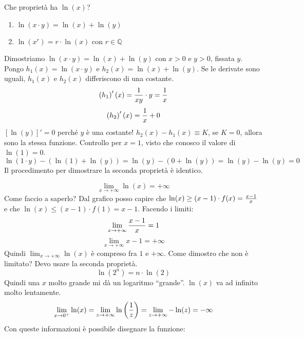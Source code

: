 \documentclass[12pt,a4paper]{article}
\begin{document}
Che propriet\`a ha $\ln(x)$?
\begin{enumerate}
\item   $\ln(x \cdot y) = \ln(x) + \ln(y) $
\item   $\ln(x^r) = r \cdot \ln(x)$ con $r \in \mathbb{Q}$
\end{enumerate}
Dimostriamo $\ln(x \cdot y) = \ln(x) + \ln(y)$ con $x>0$ e $y>0$,
fissata $y$. Pongo $h_1 (x) = \ln(x \cdot y)$ e 
$h_2 (x) = \ln(x) + \ln(y)$. Se le derivate sono uguali, $h_1(x)$
e $h_2(x)$ differiscono di una costante.
$$ \left( h_1 \right)'(x) = {1 \over xy} \cdot y = {1 \over x} $$
$$ \left( h_2 \right)'(x) = {1 \over x} + 0 $$
$\left[ \ln(y) \right]' = 0$ perch\'e $y$ \`e una costante!
$ h_2 (x) - h_1(x) \equiv K$, se $K = 0$, allora sono la stessa funzione.
Controllo per $x=1$, visto che conosco il valore di $\ln(1) = 0$.
$$ \ln(1 \cdot y) - \left( \ln(1) + \ln(y) \right) = 
\ln(y) - \left( 0 + \ln(y) \right) = \ln(y) - \ln(y) = 0 $$
Il procedimento per dimostrare la seconda propriet\`a \`e identico.

$$ \lim_{x \to +\infty} \ln(x) = +\infty $$
Come faccio a saperlo? Dal grafico posso capire che
$ \ln(x) \geq (x-1) \cdot f(x) = {x-1 \over x} $ e che
$ \ln(x) \leq (x-1) \cdot f(1) = x-1 $. Facendo i limiti:
$$ \lim_{x \to +\infty} {x-1 \over x} = 1 $$
$$ \lim_{x \to +\infty} x-1 = +\infty $$
Quindi $\lim_{x \to +\infty} \ln(x)$ \`e compreso fra $1$ e $+\infty$.
Come dimostro che non \`e limitato? Devo usare la seconda propriet\`a.
$$ \ln(2^n) = n \cdot \ln(2) $$
Quindi una $x$ molto grande mi d\`a un logaritmo ``grande''. $\ln(x)$ va ad
infinito molto lentamente.
$$ \lim_{x \to 0^+} \ln(x) = \lim_{z \to +\infty} \ln \left({1 \over z}
 \right) = \lim_{z \to +\infty} - \ln(z) = - \infty $$
Con queste informazioni \`e possibile disegnare la funzione:

\begin{center}
\end{center}
\end{document}
